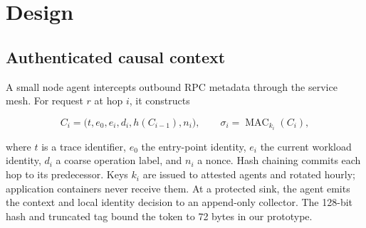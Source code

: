 \section{Design}
\label{sec:design}

\subsection{Authenticated causal context}

A small node agent intercepts outbound RPC metadata through the service mesh.
For request $r$ at hop $i$, it constructs

\begin{equation}
  C_i = \bigl(t, e_0, e_i, d_i, h(C_{i-1}), n_i\bigr),
  \qquad \sigma_i=\operatorname{MAC}_{k_i}(C_i),
  \label{eq:context}
\end{equation}

where $t$ is a trace identifier, $e_0$ the entry-point identity, $e_i$ the
current workload identity, $d_i$ a coarse operation label, and $n_i$ a nonce.
Hash chaining commits each hop to its predecessor. Keys $k_i$ are issued to
attested agents and rotated hourly; application containers never receive them.
At a protected sink, the agent emits the context and local identity decision to
an append-only collector. The 128-bit hash and truncated tag bound the token to
72 bytes in our prototype.

